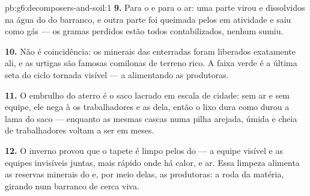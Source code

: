\begin{solution}{pb:g6:decomposers-and-soil:1}
\textbf{9.} Para o  e para o ar: uma parte virou  e  dissolvidos na água do  do barranco, e outra parte foi
queimada pelos  em atividade e saiu como gás --- os
gramas perdidos estão todos contabilizados, nenhum sumiu.

\textbf{10.} Não é coincidência: os minerais das  enterradas
foram liberados exatamente ali, e as urtigas são famosas comilonas de
terreno rico. A faixa verde é a última seta do ciclo tornada visível
--- a  alimentando as produtoras.

\textbf{11.} O embrulho do aterro é o saco lacrado em escala de
cidade: sem ar e sem equipe, ele nega à  os trabalhadores
e as  dela, então o lixo dura como durou a lama do saco ---
enquanto as mesmas cascas numa pilha arejada, úmida e cheia de
trabalhadores voltam a ser  em meses.

\textbf{12.} O inverno provou que o tapete é limpo pelos
 do  --- a equipe visível e as equipes invisíveis
juntas, mais rápido onde há calor,  e ar. Essa limpeza
alimenta as reservas minerais do  e, por meio delas, as
produtoras: a roda da matéria, girando num barranco de cerca viva.
\end{solution}
